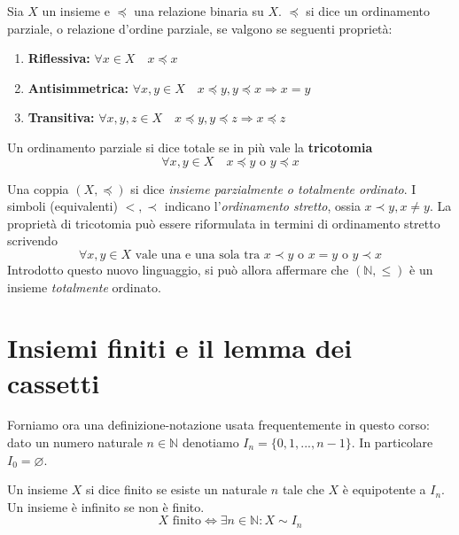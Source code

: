 \documentclass[oneside]{book}
\theoremstyle{remark}
\begin{document}
\begin{tcolorbox}[colback=yellow!30, colframe=yellow!30!black, title={Relazione d'ordine parziale e totale}]
Sia $X$ un insieme e $\preceq$ una relazione binaria su
$X$. $\preceq$ si dice un ordinamento parziale, o relazione
d'ordine parziale, se valgono se seguenti proprietà:
\begin{enumerate}
    \item \textbf{Riflessiva:} $\forall x\in X \quad x\preceq x$
    \item \textbf{Antisimmetrica:} $\forall x,y\in X \quad x\preceq y, y\preceq x \Longrightarrow x = y$
    \item \textbf{Transitiva:} $\forall x,y,z\in X \quad x\preceq y, y\preceq z \Longrightarrow x\preceq z$
\end{enumerate}
Un ordinamento parziale si dice totale se in più vale la \textbf{tricotomia}
\[ \forall x,y\in X \quad x\preceq y \text{ o } y\preceq x \]
\end{tcolorbox}
Una coppia $(X,\preceq)$ si dice \textit{insieme parzialmente o totalmente
ordinato}.
I simboli (equivalenti) $<,\prec$ indicano l'\textit{ordinamento stretto}, ossia
$x\prec y, x\not=y$. La proprietà di tricotomia può essere riformulata
in termini di ordinamento stretto scrivendo
\[ \forall x,y\in X \text{ vale una e una sola tra } x\prec y \text{ o } x=y \text{ o } y\prec x \]
Introdotto questo nuovo linguaggio, si può allora affermare che
$(\mathbb{N},\leq)$ è un insieme \textit{totalmente} ordinato.

\section{Insiemi finiti e il lemma dei cassetti}
Forniamo ora una definizione-notazione usata frequentemente in
questo corso: dato un numero naturale $n\in\mathbb{N}$ denotiamo
$I_n = \{0,1,...,n-1\}$. In particolare $I_0 = \varnothing$.

\begin{tcolorbox}[colback=yellow!30, colframe=yellow!30!black, title={Insieme finito}]
Un insieme $X$ si dice finito se esiste un naturale $n$ tale che
$X$ è equipotente a $I_n$. Un insieme è infinito se non è finito.
\[ X \text{ finito} \Longleftrightarrow \exists n\in\mathbb{N}: X\sim I_n \]
\end{tcolorbox}
\end{document}
